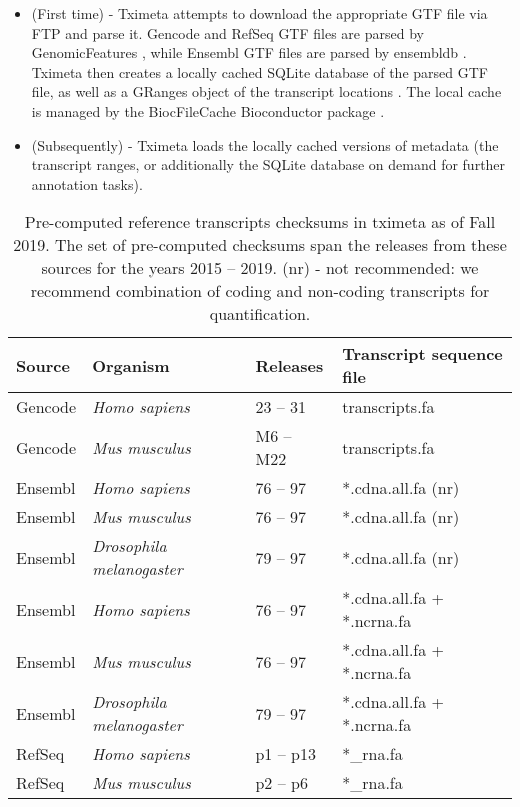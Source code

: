 \documentclass[12pt]{article} \usepackage[utf8]{inputenc}
\begin{document}
\begin{itemize}
\item (First time) - Tximeta attempts to download the appropriate GTF
  file via FTP and parse it. Gencode and RefSeq GTF files are parsed
  by GenomicFeatures \citep{granges}, while Ensembl GTF files are
  parsed by ensembldb \citep{ensembldb}. Tximeta then creates a
  locally cached SQLite database of the parsed GTF file, as well as a
  GRanges object of the transcript locations \citep{granges}. The
  local cache is managed by the BiocFileCache Bioconductor package
  \citep{biocfilecache}.
\item (Subsequently) - Tximeta loads the locally cached versions of
  metadata (the transcript ranges, or additionally the SQLite database
  on demand for further annotation tasks).
\end{itemize}

\begin{table}[t]
\centering
\begin{tabular}{llll} 
\hline Source & Organism & Releases & Transcript sequence file
\\ \hline\hline Gencode & \textit{Homo sapiens} & 23 -- 31 &
transcripts.fa \\ Gencode & \textit{Mus musculus} & M6 -- M22 &
transcripts.fa \\ \hline Ensembl & \textit{Homo sapiens} & 76 -- 97 &
*.cdna.all.fa (nr) \\ Ensembl & \textit{Mus musculus} & 76 -- 97 &
*.cdna.all.fa (nr) \\ Ensembl & \textit{Drosophila melanogaster} & 79
-- 97 & *.cdna.all.fa (nr) \\ \hline Ensembl & \textit{Homo sapiens} &
76 -- 97 & *.cdna.all.fa + *.ncrna.fa \\ Ensembl & \textit{Mus
  musculus} & 76 -- 97 & *.cdna.all.fa + *.ncrna.fa \\ Ensembl &
\textit{Drosophila melanogaster} & 79 -- 97 & *.cdna.all.fa +
*.ncrna.fa \\ \hline RefSeq & \textit{Homo sapiens} & p1 -- p13 &
*\_rna.fa \\ RefSeq & \textit{Mus musculus} & p2 -- p6 & *\_rna.fa
\\ \hline
\end{tabular}
\caption{Pre-computed reference transcripts checksums in tximeta as of
  Fall 2019. The set of pre-computed checksums span the releases from
  these sources for the years 2015 -- 2019. (nr) - not recommended: we
  recommend combination of coding and non-coding transcripts for
  quantification.}
\label{tab1}
\end{table}
\end{document}
